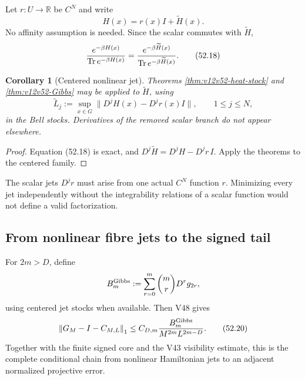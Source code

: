 \documentclass[11pt]{article}
\newtheorem{corollary}[theorem]{Corollary}
\theoremstyle{remark}
\begin{document}
Let \(r:U\to\mathbb R\) be \(C^N\) and write
\begin{equation}
                         H(x)=r(x)I+\widetilde H(x).        \tag{52.17}
\end{equation}
No affinity assumption is needed.  Since the scalar commutes with
\(\widetilde H\),
\begin{equation}
 {e^{-\beta H(x)}
  \over\operatorname{Tr}e^{-\beta H(x)}}
 =
 {e^{-\beta\widetilde H(x)}
  \over\operatorname{Tr}e^{-\beta\widetilde H(x)}}.        \tag{52.18}
\end{equation}

\begin{corollary}[Centered nonlinear jet]
\label{cor:v12v52-centered}
Theorems \ref{thm:v12v52-heat-stock} and
\ref{thm:v12v52-Gibbs} may be applied to \(\widetilde H\), using
\begin{equation}
 \widetilde L_j
 :=
 \sup_{x\in G}
 \|D^jH(x)-D^jr(x)I\|,
 \qquad1\leq j\leq N,                            \tag{52.19}
\end{equation}
in the Bell stocks.  Derivatives of the removed scalar branch do
not appear elsewhere.
\end{corollary}

\begin{proof}
Equation (52.18) is exact, and
\(D^j\widetilde H=D^jH-D^jr\,I\).  Apply the theorems to the centered
family.
\end{proof}

The scalar jets \(D^jr\) must arise from one actual \(C^N\) function
\(r\).  Minimizing every jet independently without the integrability
relations of a scalar function would not define a valid
factorization.

\subsection{From nonlinear fibre jets to the signed tail}

For \(2m>D\), define
\[
 B_m^{\rm Gibbs}:=
 \sum_{r=0}^m\binom mrD^rg_{2r},
\]
using centered jet stocks when available.  Then V48 gives
\begin{equation}
 \left\|G_M-I-C_{M,L}\right\|_1
 \leq
 C_{D,m}
 {B_m^{\rm Gibbs}\over M^{2m}L^{2m-D}}.           \tag{52.20}
\end{equation}
Together with the finite signed core and the V43 visibility
estimate, this is the complete conditional chain from nonlinear
Hamiltonian jets to an adjacent normalized projective error.
\end{document}
